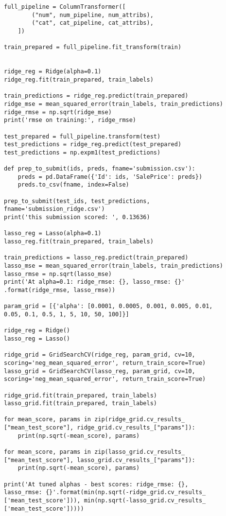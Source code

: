 \documentclass[12pt]{article}%
\begin{document}
\begin{lstlisting}
full_pipeline = ColumnTransformer([
        ("num", num_pipeline, num_attribs),
        ("cat", cat_pipeline, cat_attribs),
    ])

train_prepared = full_pipeline.fit_transform(train)


ridge_reg = Ridge(alpha=0.1)
ridge_reg.fit(train_prepared, train_labels)

train_predictions = ridge_reg.predict(train_prepared)
ridge_mse = mean_squared_error(train_labels, train_predictions)
ridge_rmse = np.sqrt(ridge_mse)
print('rmse on training:', ridge_rmse)

test_prepared = full_pipeline.transform(test)
test_predictions = ridge_reg.predict(test_prepared)
test_predictions = np.expm1(test_predictions)

def prep_to_submit(ids, preds, fname='submission.csv'):
    preds = pd.DataFrame({'Id': ids, 'SalePrice': preds})
    preds.to_csv(fname, index=False)
    
prep_to_submit(test_ids, test_predictions, fname='submission_ridge.csv')
print('this submission scored: ', 0.13636)

lasso_reg = Lasso(alpha=0.1)
lasso_reg.fit(train_prepared, train_labels)

train_predictions = lasso_reg.predict(train_prepared)
lasso_mse = mean_squared_error(train_labels, train_predictions)
lasso_rmse = np.sqrt(lasso_mse)
print('At alpha=0.1: ridge_rmse: {}, lasso_rmse: {}'
.format(ridge_rmse, lasso_rmse))

param_grid = [{'alpha': [0.0001, 0.0005, 0.001, 0.005, 0.01, 
0.05, 0.1, 0.5, 1, 5, 10, 50, 100]}]

ridge_reg = Ridge()
lasso_reg = Lasso()

ridge_grid = GridSearchCV(ridge_reg, param_grid, cv=10, 
scoring='neg_mean_squared_error', return_train_score=True)
lasso_grid = GridSearchCV(lasso_reg, param_grid, cv=10,
scoring='neg_mean_squared_error', return_train_score=True)

ridge_grid.fit(train_prepared, train_labels)
lasso_grid.fit(train_prepared, train_labels)

for mean_score, params in zip(ridge_grid.cv_results_
["mean_test_score"], ridge_grid.cv_results_["params"]):
    print(np.sqrt(-mean_score), params)
    
for mean_score, params in zip(lasso_grid.cv_results_
["mean_test_score"], lasso_grid.cv_results_["params"]):
    print(np.sqrt(-mean_score), params)
    
print('At tuned alphas - best scores: ridge_rmse: {}, 
lasso_rmse: {}'.format(min(np.sqrt(-ridge_grid.cv_results_
['mean_test_score'])), min(np.sqrt(-lasso_grid.cv_results_
['mean_test_score']))))


\end{lstlisting}
\end{document}
